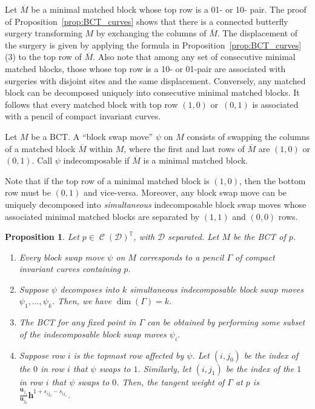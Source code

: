 \documentclass[pdftex]{sigma}
\numberwithin{equation}{section}
\newtheorem{Proposition}[Theorem]{Proposition}
 { \theoremstyle{definition}
\newtheorem{Definition}[Theorem]{Definition}
\newtheorem{Note}[Theorem]{Note}
\newtheorem{Example}[Theorem]{Example}
\newtheorem{Remark}[Theorem]{Remark} }
\newcommand{\brane}{\mathcal D}
\newcommand{\torus}{\mathbb T}
\newcommand{\hb}{\mathbf h}
\newcommand{\ub}{\mathbf u}
\DeclareMathOperator{\bowvar}{\mathcal C}
\begin{document}
Let $\overline M$ be a minimal matched block whose top row is a 01- or 10- pair. The proof of Proposition~\ref{prop:BCT_curves} shows that there is a connected butterfly surgery transforming $M$ by exchanging the columns of $\overline M$. The displacement of the surgery is given by applying the formula in Proposition~\ref{prop:BCT_curves}\,(3) to the top row of $\overline M$. Also note that among any set of consecutive minimal matched blocks, those whose top row is a 10- or 01-pair are associated with surgeries with disjoint sites and the same displacement. Conversely, any matched block can be decomposed uniquely into consecutive minimal matched blocks. It follows that every matched block with top row $(1, 0)$ or~$(0, 1)$ is associated with a pencil of compact invariant curves.

\begin{Definition}
Let $M$ be a BCT. A ``block swap move'' $\psi$ on $M$ consists of swapping the columns of a matched block $\overline M$ within $M$, where the first and last rows of $\overline M$ are $(1, 0)$ or $(0, 1)$. Call $\psi$ indecomposable if $\overline M$ is a minimal matched block.
\end{Definition}

Note that if the top row of a minimal matched block is $(1, 0)$, then the bottom row must be $(0, 1)$ and vice-versa. Moreover, any block swap move can be uniquely decomposed into \emph{simultaneous} indecomposable block swap moves whose associated minimal matched blocks are separated by $(1, 1)$ and $(0, 0)$ rows.

\begin{Proposition}
Let $p\in\bowvar(\brane)^\torus$, with $\brane$ separated. Let $M$ be the BCT of $p$.
\begin{enumerate}\itemsep=0pt
\item[$(1)$] Every block swap move $\psi$ on $M$ corresponds to a pencil $\Gamma$ of compact invariant curves containing $p$.
\item[$(2)$] Suppose $\psi$ decomposes into $k$ simultaneous indecomposable block swap moves $\psi_1, \dots , \psi_k$. Then, we have $\dim(\Gamma) = k$.
\item[$(3)$] The BCT for any fixed point in $\Gamma$ can be obtained by performing some subset of the indecomposable block swap moves $\psi_i$.
\item[$(4)$] Suppose row $i$ is the topmost row affected by $\psi$. Let $(i, j_0)$ be the index of the $0$ in row $i$ that $\psi$ swaps to $1$. Similarly, let $(i, j_1)$ be the index of the $1$ in row $i$ that $\psi$ swaps to $0$. Then, the tangent weight of $\Gamma$ at $p$ is $\frac{\ub_{j_1}}{\ub_{j_0}}\hb^{1+s_{i j_0}-s_{i j_1}}$.
\end{enumerate}
\end{Proposition}
\end{document}

